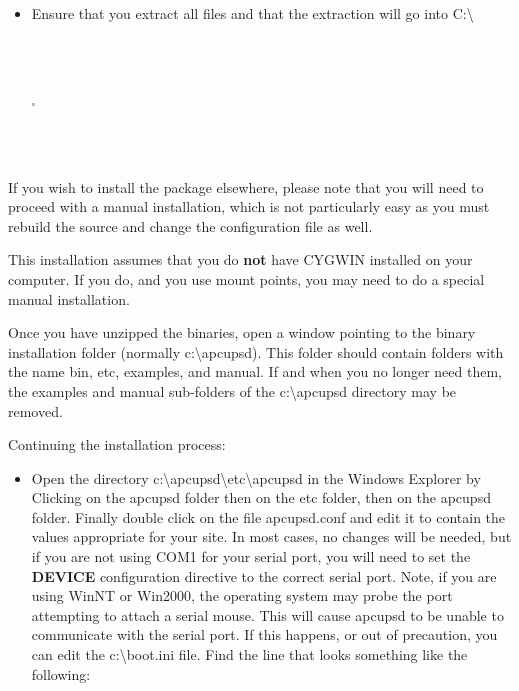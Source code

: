 {{{{{{{{{{\begin{itemize}
\footnotesize
\begin{verbatim}
     
     
\end{verbatim}
\normalsize

\item Ensure that you extract all files and that the extraction will go into
   C:\textbackslash{}  

\footnotesize
\begin{verbatim}
     
     
\end{verbatim}
\normalsize

\includegraphics{./wininstall5.eps}  

\footnotesize
\begin{verbatim}
     
     
\end{verbatim}
\normalsize

\end{itemize}

If you wish to install the package elsewhere, please note that you will need
to proceed with a manual installation, which is not particularly easy as you
must rebuild the source and change the configuration file as well.  

This installation assumes that you do {\bf not} have CYGWIN installed on your
computer. If you do, and you use mount points, you may need to do a special
manual installation.  

Once you have unzipped the binaries, open a window pointing to the binary
installation folder (normally c:\textbackslash{}apcupsd). This folder should
contain folders with the name bin, etc, examples, and manual. If and when you
no longer need them, the examples and manual sub-folders of the
c:\textbackslash{}apcupsd directory may be removed.  

Continuing the installation process:  

\begin{itemize}
\item Open the directory
   c:\textbackslash{}apcupsd\textbackslash{}etc\textbackslash{}apcupsd in the
   Windows Explorer by Clicking on the apcupsd folder then on the etc folder,
then on the apcupsd folder. Finally double click on the file apcupsd.conf and
edit it to contain the values appropriate for your site. In most cases, no
changes will be needed, but if you are not using COM1 for your serial port,
you will need to set the {\bf DEVICE} configuration directive to the correct
serial port. Note, if you are using WinNT or Win2000, the operating system may
probe the port attempting to attach a serial mouse. This will cause apcupsd to
be unable to communicate with the serial port. If this happens, or out of
precaution, you can edit the c:\textbackslash{}boot.ini file. Find the line
that looks something like the following:  


\end{itemize}}}}}}}}}}}
